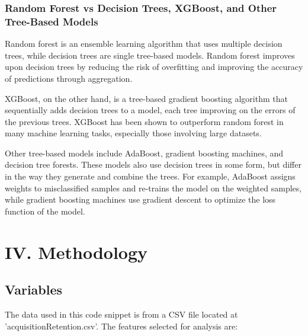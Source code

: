 \hypertarget{random-forest-vs-decision-trees-xgboost-and-other-tree-based-models}{%
\subsubsection{Random Forest vs Decision Trees, XGBoost, and Other
Tree-Based
Models}\label{random-forest-vs-decision-trees-xgboost-and-other-tree-based-models}}

Random forest is an ensemble learning algorithm that uses multiple
decision trees, while decision trees are single tree-based models.
Random forest improves upon decision trees by reducing the risk of
overfitting and improving the accuracy of predictions through
aggregation.

XGBoost, on the other hand, is a tree-based gradient boosting algorithm
that sequentially adds decision trees to a model, each tree improving on
the errors of the previous trees. XGBoost has been shown to outperform
random forest in many machine learning tasks, especially those involving
large datasets.

Other tree-based models include AdaBoost, gradient boosting machines,
and decision tree forests. These models also use decision trees in some
form, but differ in the way they generate and combine the trees. For
example, AdaBoost assigns weights to misclassified samples and re-trains
the model on the weighted samples, while gradient boosting machines use
gradient descent to optimize the loss function of the model.

\hypertarget{iv-methodology}{%
\section{IV. Methodology}\label{iv-methodology}}

\hypertarget{variables}{%
\subsection{Variables}\label{variables}}

The data used in this code snippet is from a CSV file located at
'acquisitionRetention.csv'. The features selected for analysis are:

